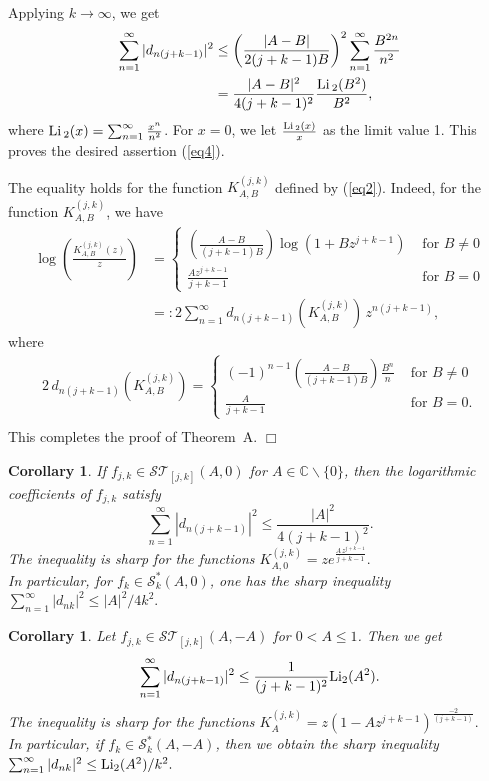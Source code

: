 \documentclass[12pt]{amsart}
\numberwithin{equation}{section}
\newtheorem{cor}[thm]{Corollary}
\theoremstyle{definition}
\numberwithin{equation}{section}
\newcommand{\bcor}{\begin{cor}}
\newcommand{\ecor}{\end{cor}}
\newcommand{\T}{{\mathcal T}}
\newcommand{\es}{{\mathcal S}}
\newcommand{\IC}{{\mathbb C}}
\begin{document}
Applying $k \rightarrow \infty$, we get
\begin{align*} \sum_{n=1}^{\infty} |d_{n(j+k-1)}|^2 & \le \left(\frac{|A-B|}{2(j+k-1)B}\right)^2\sum_{n=1}^{\infty} \frac{B^{2n}}{n^2}\\
& = \frac{|A-B|^2}{4(j+k-1)^2}\frac{{\rm Li\,}_{2}(B^2)}{B^2},
\end{align*}
where ${\rm Li\,}_{2}(x)=\sum_{n=1}^{\infty}\frac{x^n}{n^2}$. For $x=0$, we let $\frac{{\rm Li\,}_{2}(x)}{x}$ as the limit value 1.
This proves the desired assertion (\ref{eq4}).

The equality holds for the function $K^{(j,k)}_{A,B}$  defined by (\ref{eq2}).
Indeed, for the function $K^{(j,k)}_{A,B}$, we have
\begin{align*}
\displaystyle \log \left( \frac{K^{(j,k)}_{A,B}(z)}{z} \right) & =
\left \{
\begin{array}{ll}
 \displaystyle \left (\frac{A-B}{(j+k-1)B}\right )\log (1+Bz^{j+k-1}) & \mbox{ for } B\neq 0\\[6mm]
\frac{Az^{j+k-1}}{j+k-1} & \mbox{ for } B=0
 \end{array} \right. \\[4mm]
 & =: 2\sum_{n=1}^{\infty} d_{n(j+k-1)}(K^{(j,k)}_{A,B})\,z^{n(j+k-1)},
\end{align*}
where
\begin{align}\label{eqA.4}
\displaystyle 2\,d_{n(j+k-1)}(K^{(j,k)}_{A,B}) =
\left \{
\begin{array}{ll}
\displaystyle 
(-1)^{n-1} \left (\frac{A-B}{(j+k-1)B}\right )\frac{B^n}{n}& \mbox{ for } B\neq 0 \\[2mm]
\displaystyle  \frac{A}{j+k-1} & \mbox{ for } B=0. 
 \end{array} \right. \\ \nonumber
\end{align}
This completes the proof of Theorem~A.
\hfill$\Box$
\bcor\label{cor1}
 If $f_{j,k} \in \es \T_{[j,k]}(A,0)$ for $A\in \IC\backslash \{0\}$, then the logarithmic coefficients of $f_{j,k}$ satisfy 
 $$ \sum_{n=1}^{\infty}|d_{n(j+k-1)}|^2 \le \frac{|A|^2}{4(j+k-1)^2}.
 $$
The inequality is sharp for the functions $K^{(j,k)}_{A,0}=ze^{\frac{A\,z^{j+k-1}}{j+k-1}}.$\\
In particular, for $f_{k} \in \es^*_{k}(A,0)$, one has the sharp inequality
$ \sum_{n=1}^{\infty}|d_{nk}|^2 \le |A|^2/4k^2 .$ %
\ecor
\bcor\label{cor2}
 Let $f_{j,k} \in \es \T_{[j,k]}(A,-A)$ for $0<A \le 1$. Then we get 
 $$ \sum_{n=1}^{\infty}|d_{n(j+k-1)}|^2 \le \frac{1}{(j+k-1)^2} {\rm Li_2}(A^2).
 $$
The inequality is sharp for the functions $K^{(j,k)}_{A}=z(1-Az^{j+k-1})^{\frac{-2}{(j+k-1)}}.$\\
In particular, if $f_{k} \in \es^*_{k}(A,-A)$, then we obtain the sharp inequality
$ \sum_{n=1}^{\infty}|d_{nk}|^2 \le {\rm Li_2}(A^2)/k^2.$
\ecor
\end{document}
